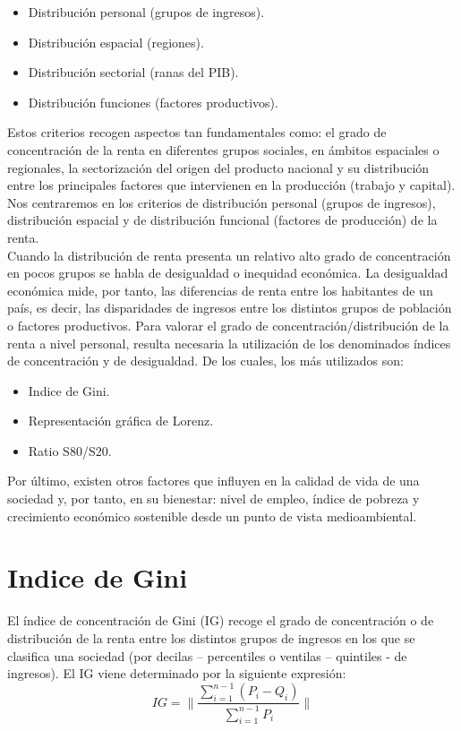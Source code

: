 \begin{itemize}
    \item Distribución personal (grupos de ingresos).
    \item Distribución espacial (regiones).
    \item Distribución sectorial (ranas del PIB).
    \item Distribución funciones (factores productivos).
\end{itemize}
Estos criterios recogen aspectos tan fundamentales como: el grado de concentración de la renta en diferentes grupos sociales, en ámbitos espaciales o regionales, la sectorización del origen del producto nacional y su distribución entre los principales factores que intervienen en la producción (trabajo y capital).\\
Nos centraremos en los criterios de distribución personal (grupos de ingresos), distribución espacial y de distribución funcional (factores de producción) de la renta.\\
Cuando la distribución de renta presenta un relativo alto grado de concentración en pocos grupos se habla de desigualdad o inequidad económica. La desigualdad económica mide, por tanto, las diferencias de renta entre los habitantes de un país, es decir, las disparidades de ingresos entre los distintos grupos de población o factores productivos. Para valorar el grado de concentración/distribución de la renta a nivel personal, resulta necesaria la utilización de los denominados índices de concentración y de desigualdad. De los cuales, los más utilizados son: 
\begin{itemize}
    \item Indice de Gini. 
    \item Representación gráfica de Lorenz. 
    \item Ratio S80/S20.
\end{itemize}
Por último, existen otros factores que influyen en la calidad de vida de una sociedad y, por tanto, en su bienestar: nivel de empleo, índice de pobreza y crecimiento económico sostenible desde un punto de vista medioambiental.

\section{Indice de Gini}
El índice de concentración de Gini (IG) recoge el grado de concentración o de distribución de la renta entre los distintos grupos de ingresos en los que se clasifica una sociedad (por decilas – percentiles o ventilas – quintiles - de ingresos). El IG viene determinado por la siguiente expresión:
\begin{equation}
    IG = \bigg\|\dfrac{\sum\limits_{i=1}^{n-1}\left(P_i-Q_i\right)}{\sum\limits_{i=1}^{n-1}P_i}\bigg\| 
\end{equation}

